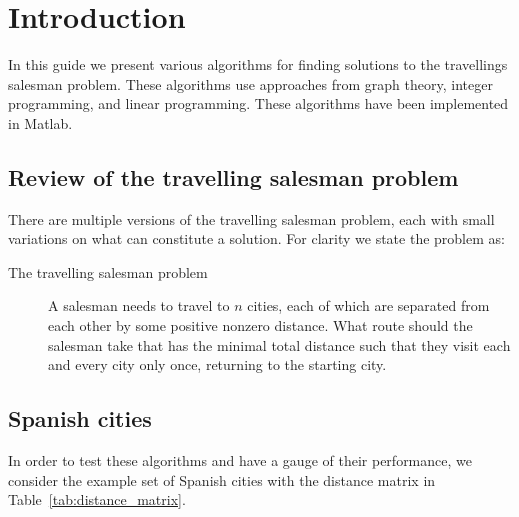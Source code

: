 \section{Introduction}
\label{sec:introduction}

In this guide we present various algorithms for finding solutions to the travellings salesman problem. These algorithms use approaches from graph theory, integer programming, and linear programming. These algorithms have been implemented in Matlab.

\subsection{Review of the travelling salesman problem}
\label{subsec:review_of_tsp}

There are multiple versions of the travelling salesman problem, each with small variations on what can constitute a solution. For clarity we state the problem as:
\begin{description}
\item[The travelling salesman problem] A salesman needs to travel to $ n $ cities, each of which are separated from each other by some positive nonzero distance. What route should the salesman take that has the minimal total distance such that they visit each and every city only once, returning to the starting city.
\end{description}


\subsection{Spanish cities}
\label{subsec:spanish_cities}

In order to test these algorithms and have a gauge of their performance, we consider the example set of Spanish cities with the  distance matrix in Table~\ref{tab:distance_matrix}.

